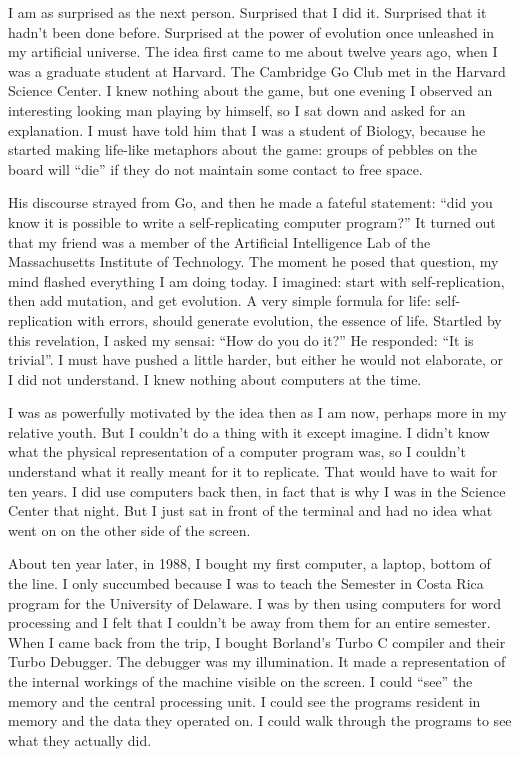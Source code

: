 I am as surprised as the next person.  Surprised that I did it.  Surprised
that it hadn't been done before.  Surprised at the power of evolution once
unleashed in my artificial universe.  The idea first came to me about twelve
years ago, when I was a graduate student at Harvard.  The Cambridge Go Club
met in the Harvard Science Center.  I knew nothing about the game, but one
evening I observed an interesting looking man playing by himself, so I sat
down and asked for an explanation.  I must have told him that I was a student
of Biology, because he started making life-like metaphors about the game:
groups of pebbles on the board will ``die'' if they do not maintain some
contact to free space.

His discourse strayed from Go, and then he made a fateful statement:
``did you know it is possible to write a self-replicating computer program?''
It turned out that my friend was a member of the Artificial Intelligence Lab
of the Massachusetts Institute of Technology.  The moment he posed that
question, my mind flashed everything I am doing today.  I imagined: start
with self-replication, then add mutation, and get evolution.  A very simple
formula for life: self-replication with errors, should generate
evolution, the essence of life.  Startled by this revelation, I asked my
sensai: ``How do you do it?'' He responded: ``It is trivial''.  I must have
pushed a little harder, but either he would not elaborate, or I did not
understand.  I knew nothing about computers at the time.

I was as powerfully motivated by the idea then as I am now, perhaps more in
my relative youth.  But I couldn't do a thing with it except imagine.  I didn't
know what the physical representation of a computer program was, so I couldn't
understand what it really meant for it to replicate.  That would have to wait
for ten years.  I did use computers back then, in fact that is why I was in
the Science Center that night.  But I just sat in front of the terminal and had
no idea what went on on the other side of the screen.

About ten year later, in 1988, I bought my first computer, a laptop, bottom
of the line.  I only succumbed because I was to teach the Semester in Costa
Rica program for the University of Delaware.  I was by then using computers
for word processing and I felt that I couldn't be away from them for an entire
semester.  When I came back from the trip, I bought Borland's Turbo C compiler
and their Turbo Debugger.  The debugger was my illumination.  It made a
representation of the internal workings of the machine visible on the screen.
I could ``see'' the memory and the central processing unit.  I could see the
programs resident in memory and the data they operated on.  I could walk
through the programs to see what they actually did.

